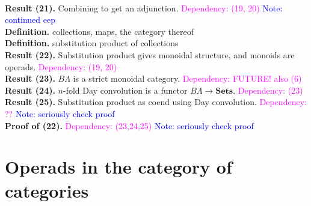 \documentclass{amsart}
\begin{document}
\\ \textbf{Result (21).} Combining to get an adjunction. \textcolor{magenta}{Dependency: (19, 20)} \textcolor{blue}{Note: continued eep}
\\ \textbf{Definition.} collections, maps, the category thereof
\\ \textbf{Definition.} substitution product of collections
\\ \textbf{Result (22).} Substitution product gives monoidal structure, and monoids are operads. \textcolor{magenta}{Dependency: (19, 20)}
\\ \textbf{Result (23).} $B\Lambda$ is a strict monoidal category. \textcolor{magenta}{Dependency: FUTURE! also (6)}
\\ \textbf{Result (24).} $n$-fold Day convolution is a functor $B\Lambda \to \mathbf{Sets}$. \textcolor{magenta}{Dependency: (23)}
\\ \textbf{Result (25).} Substitution product as coend using Day convolution. \textcolor{magenta}{Dependency: ??} \textcolor{blue}{Note: seriously check proof}
\\ \textbf{Proof of (22).} \textcolor{magenta}{Dependency: (23,24,25)} \textcolor{blue}{Note: seriously check proof}


\section{Operads in the category of categories}
\end{document}
